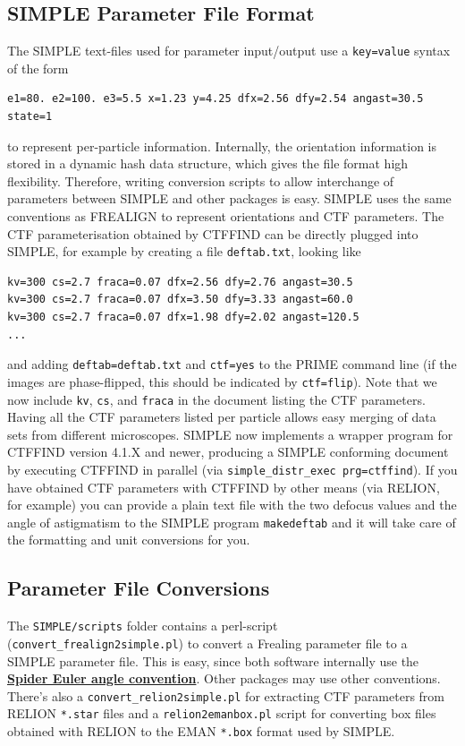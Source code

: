 \documentclass[a4paper,11pt]{article}
\newcommand{\prgname}[1]{\textcolor{NavyBlue}{\texttt{#1}}}
\begin{document}
\subsection{SIMPLE Parameter File Format}
The SIMPLE text-files used for parameter input/output use a \texttt{key=value} syntax of the form
\begin{verbatim}
e1=80. e2=100. e3=5.5 x=1.23 y=4.25 dfx=2.56 dfy=2.54 angast=30.5 state=1
\end{verbatim}
to represent per-particle information. Internally, the orientation information is stored in a dynamic hash data structure, which gives the file format high flexibility. Therefore, writing conversion scripts to allow interchange of parameters between SIMPLE and other packages is easy. SIMPLE uses the same conventions as FREALIGN \citep{Grigorieff:2007aa} to represent orientations and CTF parameters. The CTF parameterisation obtained by CTFFIND \citep{Mindell:2003aa} can be directly plugged into SIMPLE, for example by creating a file \texttt{deftab.txt}, looking like
\begin{verbatim}
kv=300 cs=2.7 fraca=0.07 dfx=2.56 dfy=2.76 angast=30.5
kv=300 cs=2.7 fraca=0.07 dfx=3.50 dfy=3.33 angast=60.0
kv=300 cs=2.7 fraca=0.07 dfx=1.98 dfy=2.02 angast=120.5
...
\end{verbatim}
and adding \texttt{deftab=deftab.txt} and \texttt{ctf=yes} to the PRIME command line (if the images are phase-flipped, this should be indicated by \texttt{ctf=flip}). Note that we now include \texttt{kv}, \texttt{cs}, and \texttt{fraca} in the document listing the CTF parameters. Having all the CTF parameters listed per particle allows easy merging of data sets from different microscopes. SIMPLE now implements a wrapper program for CTFFIND version 4.1.X and newer, producing a SIMPLE conforming document by executing CTFFIND in parallel (via \texttt{simple\_distr\_exec prg=ctffind}). If you have obtained CTF parameters with CTFFIND by other means (via RELION, for example) you can provide a plain text file with the two defocus values and the angle of astigmatism to the SIMPLE program \prgname{makedeftab} and it will take care of the formatting and unit conversions for you.

\subsection{Parameter File Conversions}
The \texttt{SIMPLE/scripts} folder contains a perl-script (\texttt{convert\_frealign2simple.pl}) to convert a Frealing parameter file to a SIMPLE parameter file. This is easy, since both software internally use the \href{http://spider.wadsworth.org/spider_doc/spider/docs/euler.html}{\textbf{\textcolor{BurntOrange}{Spider Euler angle convention}}}. Other packages may use other conventions. There's also a \texttt{convert\_relion2simple.pl} for extracting CTF parameters from RELION \texttt{*.star} files and a \texttt{relion2emanbox.pl} script for converting box files obtained with RELION to the EMAN \texttt{*.box} format used by SIMPLE.
\end{document}
